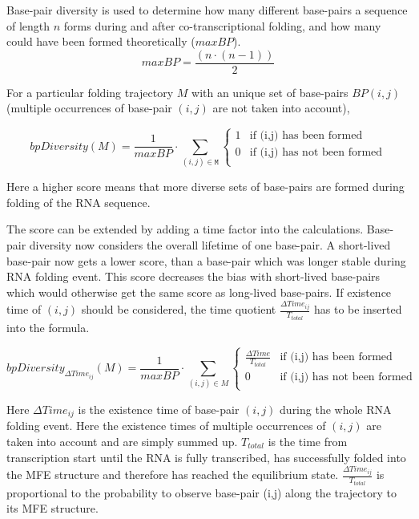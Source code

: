 \documentclass[ twoside,openright,titlepage,numbers=noenddot,headinclude,%
                footinclude=false, cleardoublepage=empty,abstractoff, %
                BCOR=5mm,paper=a4,fontsize=11pt,%
                ngerman,american,%
                ]{scrreprt}
\begin{document}
Base-pair diversity is used to determine how many different base-pairs a
sequence of length $n$ forms during and after co-transcriptional folding, and how many
could have been formed theoretically ($maxBP$).
\begin{equation}
maxBP= \frac{(n\cdot(n-1))}{2}
\label{eq:maximal base-pairs}
\end{equation}


For a particular folding trajectory $M$ with an unique set of base-pairs $BP(i,j)$ (multiple occurrences of base-pair $(i,j)$ are not taken into account),

\begin{equation}
bpDiversity(M) = \frac{1}{maxBP}\cdot \sum\limits_{(i,j) \in \texttt{M}} 
\begin{cases} 1 & \mbox{if  (i,j) has been formed} \\ 
0 & \mbox{if  (i,j) has not been formed} \\ 
\end{cases}
\label{eq:base-pair diversity}
\end{equation}
 
Here a higher score means that more diverse sets of base-pairs are formed
during folding of the RNA sequence.  


The score can be extended by adding a time factor into the
calculations. Base-pair diversity now considers the overall lifetime of one
base-pair. A short-lived base-pair now gets a lower score, than a base-pair
which was longer stable during RNA folding event. This score decreases the
bias with short-lived base-pairs which would otherwise get the same score
as long-lived base-pairs. If existence time of $(i,j)$ should be considered, the time quotient $\frac{\Delta Time_{ij}}{T_{total}}$ has to be
inserted into the formula.

\begin{equation}
bpDiversity_{\Delta Time_{ij}}(M) = \frac{1}{maxBP}\cdot \sum\limits_{(i,j) \in M} 
\begin{cases} \frac{\Delta Time}{T_{total}} & \mbox{if  (i,j) has been formed} \\ 
0 & \mbox{if  (i,j) has not been formed} \\ 
\end{cases}
\label{eq:base-pair diversity time depended}
\end{equation}	

Here $\Delta Time_{ij}$ is the existence time of base-pair $(i,j)$ during the whole
RNA folding event. Here the existence times of multiple occurrences of $(i,j)$ are taken into account and are simply summed up.
$T_{total}$ is the time from transcription start until the RNA is fully transcribed, has successfully
folded into the MFE structure and therefore has reached the equilibrium
state. $\frac{\Delta Time_{ij}}{T_{total}}$ is proportional to the probability to observe base-pair (i,j) along the trajectory to its MFE structure.
\end{document}
